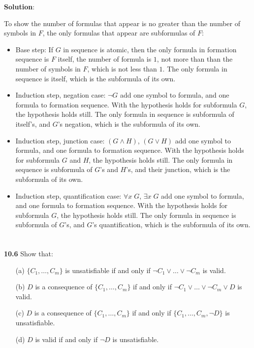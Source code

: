 \documentclass{ctexart}
\begin{document}
\textbf{Solution}:


To show the number of formulas that appear is no greater than the number of symbols in $F$,
the only formulas
that appear are subformulas of $F$:
\begin{itemize}
	\item Base step: If $G$ in sequence is atomic, then the only formula in formation sequence is $F$ itself,
	the number of formula is $1$, not more than than the number of symbols in $F$, which is not less
	than $1$. The only formula in sequence is itself, which is the subformula of its own.
	
	\item Induction step, negation case: $\lnot G$ add one symbol to formula, and one formula to formation
	sequence. With the hypothesis holds for subformula $G$, the hypothesis holds still. The only formula in
	sequence is subformula of itself's, and $G$'s negation, which is the subformula of its own.
	
	\item Induction step, junction case: $(G \land H)$, $(G \lor H)$ add one symbol to formula, and one formula to formation
	sequence. With the hypothesis holds for subformula $G$ and $H$, the hypothesis holds still. The only formula in
	sequence is subformula of $G$'s and $H$'s, and their junction, which is the subformula of its own.
	
	\item Induction step, quantification case: $\forall x\; G$, $\exists x\; G$ add one symbol to formula,
	and one formula to formation
	sequence. With the hypothesis holds for subformula $G$, the hypothesis holds still.
	The only formula in
	sequence is subformula of $G$'s, and $G$'s quantification, which is the subformula of its own.
\end{itemize}

\section*{}
\textbf{10.6} Show that:
\begin{itemize}
\item[(a)] $\{C_1 , \dots , C_m \}$ is unsatisfiable if and only if $\lnot C_1 \lor \dots \lor \lnot C_m$ is valid.
\item[(b)] $D$ is a consequence of $\{C_1 , \dots , C_m \}$ if and only if $\lnot C_1 \lor \dots \lor \lnot C_m \lor D$
is valid.
\item[(c)] $D$ is a consequence of $\{C_1 , \dots , C_m \}$ if and only if $\{C_1 , \dots , C_m, \lnot D\}$ is
unsatisfiable.
\item[(d)] $D$ is valid if and only if $\lnot D$ is unsatisfiable.
\end{itemize}
\end{document}
